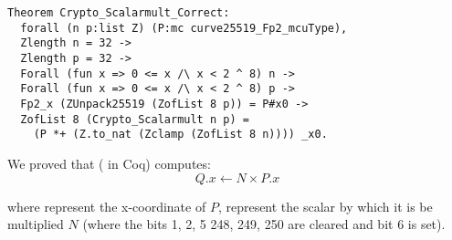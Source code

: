 \begin{lstlisting}[language=Coq]
Theorem Crypto_Scalarmult_Correct:
  forall (n p:list Z) (P:mc curve25519_Fp2_mcuType),
  Zlength n = 32 ->
  Zlength p = 32 ->
  Forall (fun x => 0 <= x /\ x < 2 ^ 8) n ->
  Forall (fun x => 0 <= x /\ x < 2 ^ 8) p ->
  Fp2_x (ZUnpack25519 (ZofList 8 p)) = P#x0 ->
  ZofList 8 (Crypto_Scalarmult n p) =
    (P *+ (Z.to_nat (Zclamp (ZofList 8 n)))) _x0.
\end{lstlisting}

We proved that  ( in Coq)
computes: $$Q.x \leftarrow N \times P.x$$

where  represent the x-coordinate of $P$,  represent the
scalar by which it is be multiplied $N$ (where the bits 1, 2, 5 248, 249, 250
are cleared and bit 6 is set).

